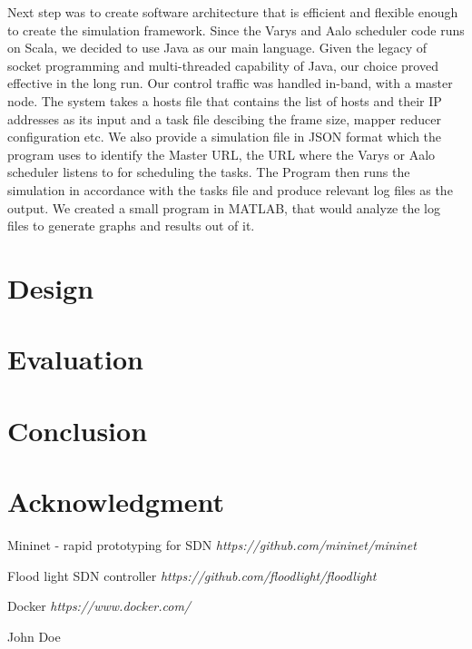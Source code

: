 \documentclass[conference]{IEEEtran}
\begin{document}
Next step was to create software architecture that is efficient and flexible enough to create the simulation framework. Since the Varys and Aalo scheduler code runs on Scala, we decided to use Java as our main language. Given the legacy of socket programming and multi-threaded capability of Java, our choice proved effective in the long run. Our control traffic was handled in-band, with a master node. The system takes a hosts file that contains the list of hosts and their IP addresses as its input and a task file descibing the frame size, mapper reducer configuration etc. We also provide a simulation file in JSON format which the program uses to identify the Master URL, the URL where the Varys or Aalo scheduler listens to for scheduling the tasks. The Program then runs the simulation in accordance with the tasks file and produce relevant log files as the output. We created a small program in MATLAB, that would analyze the log files to generate graphs and results out of it.

\section{Design}

\section{Evaluation}

\section{Conclusion}

\section*{Acknowledgment}

\begin{thebibliography}{10}

Mininet - rapid prototyping for SDN
\textit{https://github.com/mininet/mininet}

Flood light SDN controller
\textit{https://github.com/floodlight/floodlight}

Docker
\textit{https://www.docker.com/}

\end{thebibliography}


\begin{IEEEbiography}{John Doe}
\blindtext
\end{IEEEbiography}
\end{document}

